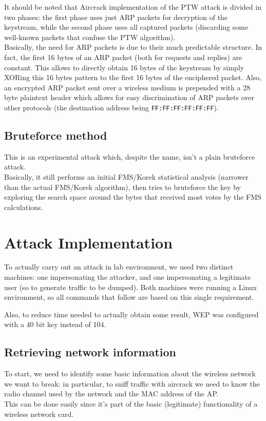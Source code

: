 \documentclass[a4paper,12pt,titlepage]{article}
\begin{document}
It should be noted that Aircrack implementation of the PTW attack is divided in
two phases: the first phase uses just ARP packets for decryption of the
keystream, while the second phase uses all captured packets (discarding some
well-known packets that confuse the PTW algorithm). \\
Basically, the need for ARP packets is due to their much predictable structure.
In fact, the first 16 bytes of an ARP packet (both for requests and replies)
are constant. This allows to directly obtain 16 bytes of the keystream by
simply XORing this 16 bytes pattern to the first 16 bytes of the enciphered
packet. Also, an encrypted ARP packet sent over a wireless medium is prepended
with a 28 byte plaintext header which allows for easy discrimination of ARP
packets over other protocols (the destination address being
\texttt{FF:FF:FF:FF:FF:FF}).

\subsection*{Bruteforce method}
This is an experimental attack which, despite the name, isn't a plain
bruteforce attack. \\
Basically, it still performs an initial FMS/Korek statistical analysis
(narrower than the actual FMS/Korek algorithm), then
tries to bruteforce the key by exploring the search space around the bytes that
received most votes by the FMS calculations.

\section{Attack Implementation}
To actually carry out an attack in lab environment, we used two distinct
machines: one impersonating the attacker, and one impersonating a legitimate
user (so to generate traffic to be dumped). Both machines were running a Linux
environment, so all commands that follow are based on this single requirement.

Also, to reduce time needed to actually obtain some result, WEP was configured
with a 40 bit key instead of 104.

\subsection*{Retrieving network information}
To start, we need to identify some basic information about the wireless network
we want to break: in particular, to sniff traffic with aircrack we need to know
the radio channel used by the network and the MAC address of the AP. \\
This can be done easily since it's part of the basic (legitimate) functionality
of a wireless network card.
\end{document}
